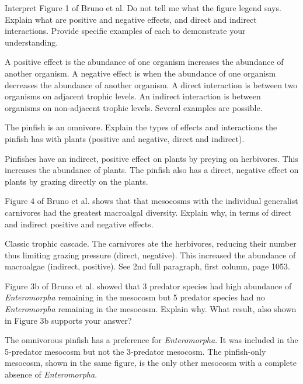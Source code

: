 \documentclass[11pt, addpoints]{exam}
\begin{document}
\begin{questions}

\question[6]
Interpret Figure 1 of Bruno et al. Do not tell me what the figure legend says. Explain what are positive and negative effects, and direct and indirect interactions. Provide specific examples of each to demonstrate your understanding. 

\begin{solution}
A positive effect is the abundance of one organism increases the abundance of another organism.  A negative effect is when the abundance of one organism decreases the abundance of another organism. A direct interaction is between two organisms on adjacent trophic levels. An indirect interaction is between organisms on non-adjacent trophic levels. Several examples are possible.
\end{solution}


\question[4]
The pinfish is an omnivore. Explain the types of effects and interactions the pinfish has with plants (positive and negative, direct and indirect). 

\begin{solution}
Pinfishes have an indirect, positive effect on plants by preying on herbivores. This increases the abundance of plants. The pinfish also has a direct, negative effect on plants by grazing directly on the plants.

\end{solution}

\question[4]
Figure 4 of Bruno et al. shows that that mesocosms with the individual generalist carnivores had the greatest macroalgal diversity. Explain why, in terms of direct and indirect positive and negative effects. 
\begin{solution}
Classic trophic cascade. The carnivores ate the herbivores, reducing their number thus limiting grazing pressure (direct, negative). This increased the abundance of macroalgae (indirect, positive).  See 2nd full paragraph, first column, page 1053.
\end{solution}

\question[5]
Figure 3b of Bruno et al. showed that 3 predator species had high abundance of \textit{Enteromorpha} remaining in the mesocosm but 5 predator species had no \textit{Enteromorpha} remaining in the mesocosm. Explain why. What result, also shown in Figure 3b supports your answer?

\begin{solution}
The omnivorous pinfish has a preference for \textit{Enteromorpha}. It was included in the 5-predator mesocosm but not the 3-predator mesocosm. The pinfish-only mesocosm, shown in the same figure, is the only other mesocosm with a complete absence of \textit{Enteromorpha}.
\end{solution}


\end{questions}
\end{document}
